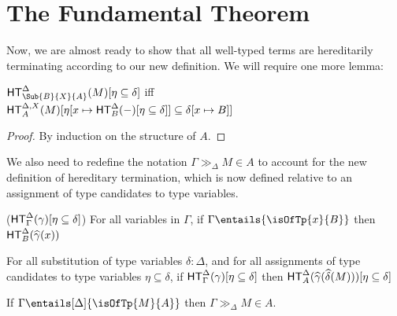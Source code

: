 \documentclass[letterpaper]{article}
\begin{document}
\section{The Fundamental Theorem}
Now, we are almost ready to show that all well-typed terms are hereditarily terminating according to our new definition. We will require one more lemma:

\begin{lemma}[Compositionality]\label{lem:ht-comp}
    $\HT[\Sub{B}{X}{A}]^{\Delta} (M) [\eta \subseteq \delta] $ iff \\ $\HT^{\Delta,X}(M)[\eta[x \mapsto \HT[B]^{\Delta}(-)[\eta \subseteq \delta]] \subseteq \delta[x \mapsto B]]$
\end{lemma}
\begin{proof}
    By induction on the structure of $A$.
\end{proof}

We also need to redefine the notation $\Gamma \gg_\Delta M \in A$ to account for the new definition of hereditary termination, which is now defined relative to an assignment of type candidates to type variables.

\begin{definition}
    ($\HT[\Gamma]^{\Delta}(\gamma)[\eta \subseteq \delta]$)
    For all variables in $\Gamma$, if $\Gamma \entails{\isOfTp{x}{B}}$ then $\HT[B]^{\Delta}(\widehat{\gamma}(x))$
\end{definition}

\begin{definition}
    For all substitution of type variables $\delta : \Delta$, and for all assignments of type candidates to type variables $\eta \subseteq \delta$, if $\HT[\Gamma]^{\Delta}(\gamma)[\eta \subseteq \delta]$ then $\HT^{\Delta}(\widehat{\gamma}(\widehat{\delta}(M)))[\eta \subseteq \delta]$
\end{definition}

\begin{theorem}\label{thm:fundamental}
    If $\Gamma \entails[\Delta]{\isOfTp{M}{A}}$ then $\Gamma \gg_{\Delta} M \in A$.
\end{theorem}
\end{document}
